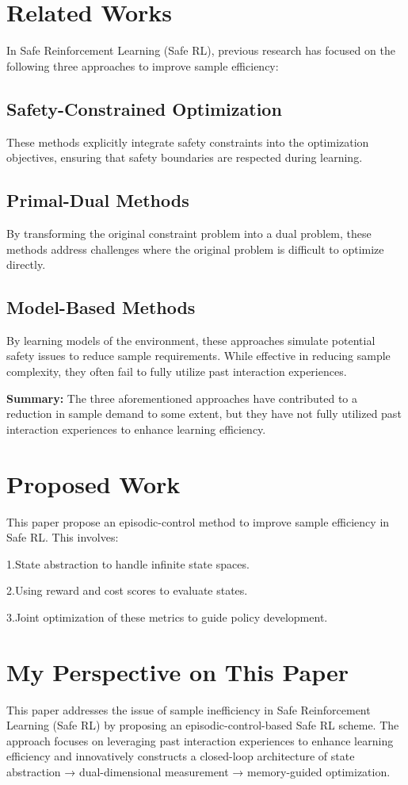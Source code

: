 \section{Related Works}
In Safe Reinforcement Learning (Safe RL), previous research has focused on the following three approaches to improve sample efficiency:
\subsection{Safety-Constrained Optimization}
These methods explicitly integrate safety constraints into the optimization objectives, ensuring that safety boundaries are respected during learning.
\subsection{Primal-Dual Methods}
By transforming the original constraint problem into a dual problem, these methods address challenges where the original problem is difficult to optimize directly.
\subsection{Model-Based Methods}
By learning models of the environment, these approaches simulate potential safety issues to reduce sample requirements. While effective in reducing sample complexity, they often fail to fully utilize past interaction experiences.

\textbf{Summary:} The three aforementioned approaches have contributed to a reduction in sample demand to some extent, but they have not fully utilized past interaction experiences to enhance learning efficiency.
\section{Proposed Work}
This paper propose an episodic-control method to improve sample efficiency in Safe RL. This involves:

1.State abstraction to handle infinite state spaces.

2.Using reward and cost scores to evaluate states.

3.Joint optimization of these metrics to guide policy development.
    
\section{My Perspective on This Paper}
This paper addresses the issue of sample inefficiency in Safe Reinforcement Learning (Safe RL) by proposing an episodic-control-based Safe RL scheme. The approach focuses on leveraging past interaction experiences to enhance learning efficiency and innovatively constructs a closed-loop architecture of state abstraction → dual-dimensional measurement → memory-guided optimization.

